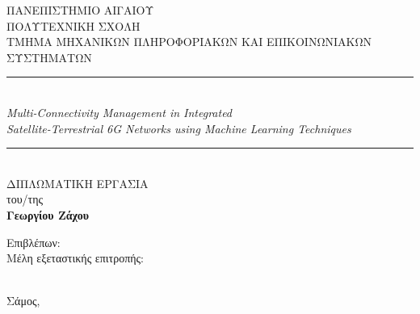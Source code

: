\begin{titlepage}
\centering
\vspace*{0.5cm}

{\large ΠΑΝΕΠΙΣΤΗΜΙΟ ΑΙΓΑΙΟΥ}\\[0.2cm]
{\large ΠΟΛΥΤΕΧΝΙΚΗ ΣΧΟΛΗ}\\[0.2cm]
{\large ΤΜΗΜΑ ΜΗΧΑΝΙΚΩΝ ΠΛΗΡΟΦΟΡΙΑΚΩΝ ΚΑΙ ΕΠΙΚΟΙΝΩΝΙΑΚΩΝ ΣΥΣΤΗΜΑΤΩΝ}\\[2.5cm]

\rule{0.8\textwidth}{0.4pt}\\[0.5cm]
{\large\itshape Multi-Connectivity Management in Integrated\\
Satellite-Terrestrial 6G Networks using Machine Learning Techniques}\\[0.5cm]
\rule{0.8\textwidth}{0.4pt}\\[0.2cm]

{\large ΔΙΠΛΩΜΑΤΙΚΗ ΕΡΓΑΣΙΑ}\\[0.3cm]
{\large του/της}\\[0.3cm]
{\large\bfseries Γεωργίου Ζάχου}\\[2.5cm]

\begin{flushleft}
\hspace{2cm}\begin{minipage}{0.7\textwidth}
\large
Επιβλέπων: \underline{\hspace{7cm}}\\[0.8cm]
Μέλη εξεταστικής επιτροπής:\\
\underline{\hspace{7cm}}\\[0.3cm]
\underline{\hspace{7cm}}
\end{minipage}
\end{flushleft}

\vfill
{\large Σάμος, \underline{\hspace{4cm}}}

\end{titlepage}
